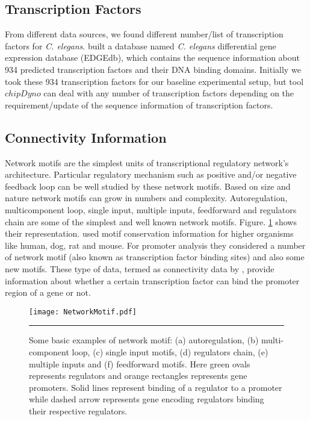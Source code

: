 \subsection{Transcription Factors}
From different data sources, we found different number/list of transcription factors for \textit{C. elegans}. \cite{Inmaculada:2007} built a database named \textit{C. elegans} differential gene expression database (EDGEdb), which contains the sequence information about 934 predicted transcription factors and their DNA binding domains. Initially we took these 934 transcription factors for our baseline experimental setup, but tool $chipDyno$ can deal with any number of transcription factors depending on the requirement/update of the sequence information of transcription factors.

\subsection{Connectivity Information}
Network motifs are the simplest units of transcriptional regulatory network's architecture. Particular regulatory mechanism such as positive and/or negative feedback loop can be well studied by these network motifs. Based on size and nature network motifs can grow in numbers and complexity. Autoregulation, multicomponent loop, single input, multiple inputs, feedforward and regulators chain are some of the simplest and well known network motifs. Figure. \ref{fig:networkMotif} shows their representation. \cite{Xie:2005} used motif conservation information for higher organisms like human, dog, rat and mouse. For promoter analysis they considered a number of network motif (also known as transcription factor binding sites) and also some new motifs. These type of data, termed as connectivity data by \cite{Liao:2003}, provide information about whether a certain transcription factor can bind the promoter region of a gene or not.

\begin{figure}
	\centering
		\texttt{[image: NetworkMotif.pdf]}
		\rule{35em}{0.5pt}
	\caption[Basic examples of network motif]
		{Some basic examples of network motif: (a) autoregulation, (b) multi-component loop, (c) single input motifs, (d) regulators chain, (e) multiple inputs and (f) feedforward motifs. Here green ovals represents regulators and orange rectangles represents gene promoters. Solid lines represent binding of a regulator to a promoter while dashed arrow represents gene encoding regulators binding their respective regulators.}
	\label{fig:networkMotif}
\end{figure}

